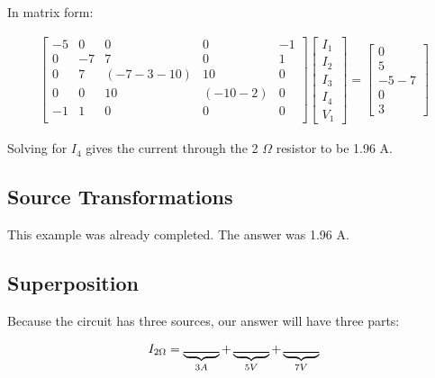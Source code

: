 In matrix form:

\begin{align*}
\left[ \begin{matrix}
-5	&0	&0	&0 &-1\\
0	&-7	&7	&0	&1\\
0	&7	&(-7-3-10) &10	&0\\
0	&0	&10	&(-10-2)	&0\\
-1	&1	&0	&0	&0	\\
\end{matrix} \right]
\left[ \begin{matrix}
I_1\\
I_2\\
I_3\\
I_4\\
V_1
\end{matrix} \right] =
\left[ \begin{matrix}
0\\
5\\
-5-7\\
0\\
3
\end{matrix} \right]
\end{align*}

Solving for $I_4$ gives the current through the 2 $\Omega$ resistor to be 1.96 A.

\subsection{Source Transformations}
This example was already completed. The answer was 1.96 A.

\subsection{Superposition}
Because the circuit has three sources, our answer will have three parts:

\begin{align}
I_{2\Omega}=\underbrace{\rule{1 cm}{.25 mm}}_{3A}+\underbrace{\rule{1 cm}{.25 mm}}_{5V}
+\underbrace{\rule{1 cm}{.25 mm}}_{7V}
\end{align}


